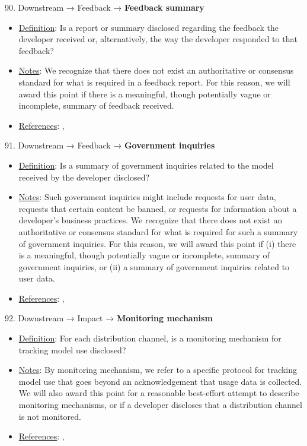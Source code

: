 90. Downstream → Feedback → \textbf{Feedback summary}
\vspace{-\parskip}
\begin{itemize}
\item
\underline{Definition}: Is a report or summary disclosed regarding the feedback the developer received or, alternatively, the way the developer responded to that feedback?
\item
\underline{Notes}: We recognize that there does not exist an authoritative or consensus standard for what is required in a feedback report. For this reason, we will award this point if there is a meaningful, though potentially vague or incomplete, summary of feedback received.
\item
\underline{References}: \citet{chen2021achieving}, \citet{piorkowski2022evaluating}
\end{itemize} \vspace{\baselineskip}


91. Downstream → Feedback → \textbf{Government inquiries}
\vspace{-\parskip}
\begin{itemize}
\item
\underline{Definition}: Is a summary of government inquiries related to the model received by the developer disclosed?
\item
\underline{Notes}: Such government inquiries might include requests for user data, requests that certain content be banned, or requests for information about a developer’s business practices. We recognize that there does not exist an authoritative or consensus standard for what is required for such a summary of government inquiries. For this reason, we will award this point if (i) there is a meaningful, though potentially vague or incomplete, summary of government inquiries, or (ii) a summary of government inquiries related to user data.
\item
\underline{References}: \citet{chou2012government}, \citet{bommasani2023ecosystem}
\end{itemize} \vspace{\baselineskip}


92. Downstream → Impact → \textbf{Monitoring mechanism}
\vspace{-\parskip}
\begin{itemize}
\item
\underline{Definition}: For each distribution channel, is a monitoring mechanism for tracking model use disclosed?
\item
\underline{Notes}: By monitoring mechanism, we refer to a specific protocol for tracking model use that goes beyond an acknowledgement that usage data is collected. We will also award this point for a reasonable best-effort attempt to describe monitoring mechanisms, or if a developer discloses that a distribution channel is not monitored.
\item
\underline{References}: \citet{springer2018progressive}, \citet{bommasani2023ecosystem}
\end{itemize} \vspace{\baselineskip}


